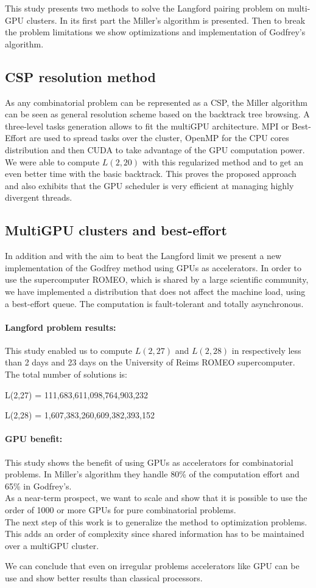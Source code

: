 This study presents two methods to solve the Langford pairing problem on multi-GPU clusters. 
In its first part the Miller's algorithm is presented. 
Then to break the problem limitations we show optimizations and implementation of Godfrey's algorithm.

\subsection{CSP resolution method}
As any combinatorial problem can be represented as a CSP, the Miller algorithm can be seen as general resolution scheme based on the backtrack tree browsing. 
A three-level tasks generation allows to fit the multiGPU architecture. 
MPI or Best-Effort are used to spread tasks over the cluster, OpenMP for the CPU cores distribution and then CUDA to take advantage of the GPU computation power.
We were able to compute $L(2,20)$ with this regularized method and to get an even better time with the basic backtrack. 
This proves the proposed approach and also exhibits that the GPU scheduler is very efficient at managing highly divergent threads.

\subsection{MultiGPU clusters and best-effort}
In addition and with the aim to beat the Langford limit we present a new implementation of the Godfrey method using GPUs as accelerators. 
In order to use the supercomputer ROMEO, which is shared by a large scientific community, we have implemented a distribution that does not affect the machine load, using a best-effort queue. The computation is fault-tolerant and totally asynchronous.

\paragraph{Langford problem results: }
This study enabled us to compute $L(2,27)$ and $L(2,28)$ in respectively less than 2 days and 23 days on the University of Reims ROMEO supercomputer. 
The total number of solutions is: 

\hspace{3cm} L(2,27) = 111,683,611,098,764,903,232

\hspace{3cm} L(2,28) = 1,607,383,260,609,382,393,152

\paragraph{GPU benefit: }
This study shows the benefit of using GPUs as accelerators for combinatorial problems. 
In Miller's algorithm they handle 80\% of the computation effort and 65\% in Godfrey's.\\
As a near-term prospect, we want to scale and show that it is possible to use the order of 1000 or more GPUs for pure combinatorial problems.\\
The next step of this work is to generalize the method to optimization problems. 
This adds an order of complexity since shared information has to be maintained over a multiGPU cluster. 

We can conclude that even on irregular problems accelerators like GPU can be use and show better results than classical processors. 
 
